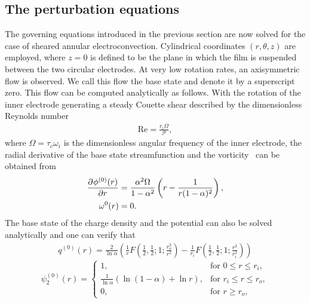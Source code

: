 \subsection{The perturbation equations}
The governing equations introduced in the previous section are now solved for the case of sheared annular electroconvection. Cylindrical coordinates $(r,\theta,z)$ are employed, where $z = 0$ is defined to be the plane in which the film is suspended between the two circular electrodes.
At very low rotation rates, an axisymmetric flow is observed. We call this flow the base state and denote it by a superscript zero. This flow can be computed analytically as follows.
With the rotation of the inner electrode generating a steady Couette shear described by the dimensionless Reynolds number
\begin{align}
\mathrm{Re} = \frac{r_i\Omega}{\mathcal{P}},
\end{align}
where $\Omega = \tau_{c}\omega_i$ is the dimensionless angular frequency of the inner electrode,
 the radial derivative of the base state streamfunction and the vorticity~\cite{EDCTAFUCF} can be obtained from
\begin{align}
\label{base_phi}
\pderiv[]{\phi^{(0)}(r)}{r} &= \frac{\alpha^2\Omega}{1-\alpha^2}\left( r-\frac{1}{r(1-\alpha)^2}\right),\\
\label{base_omega}
 \omega^{0}(r) &= 0.
\end{align}
The base state of the charge density and the potential can also be solved analytically and one can verify that
\begin{align}
\label{base_q}
q^{(0)}(r) = \frac{2}{\ln{\alpha}}\left( \frac{1}{r}F\left(\frac{1}{2},\frac{1}{2};1;\frac{r_o^2}{r^2}\right) - \frac{1}{r_i}F\left(\frac{1}{2},\frac{1}{2};1;\frac{r^2}{r_i^2}\right)\right)
\end{align}
\begin{equation}
\label{base_psi2}
    \psi_2^{(0)}(r)=
\begin{cases}
    1,& \text{for } 0\le r \le r_i,\\
    \frac{1}{\ln{\alpha}}\left(\ln{(1-\alpha)} + \ln{r}\right), & \text{for } r_i\le r \le r_o,\\
    0,              & \text{for } r\ge r_o,
\end{cases}
\end{equation}
